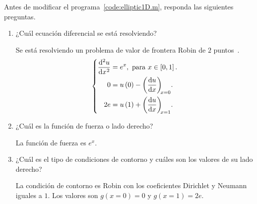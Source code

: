 \begin{problem}

Antes de modificar el programa~\ref{code:elliptic1D.m}, responda las
siguientes preguntas.

\begin{enumerate}
    \item

          ¿Cuál ecuación diferencial se está resolviendo?

          \begin{solution}
              Se está resolviendo un problema de valor de frontera
              Robin de $2$ puntos~\cite{CORBINO2020112326}.
              \begin{equation}\label{eq:poisson1drobindconditions}
                  \left\{
                  \begin{aligned}
                      \diff[2]{u}{x}
                       & =e^{x},
                      \text{ para }x\in\left[0,1\right].     \\
                      0
                       & = u\left(0\right)-\diff{u}{x}[x=0]. \\
                      2e
                       & =u\left(1\right)+\diff{u}{x}[x=1].
                  \end{aligned}
                  \right.
              \end{equation}
              \noQED
          \end{solution}

    \item

          ¿Cuál es la función de fuerza o lado derecho?

          \begin{solution}
              La función de fuerza es $e^{x}$.
              \noQED
          \end{solution}

    \item

          ¿Cuál es el tipo de condiciones de contorno y cuáles son
          los valores de su lado derecho?

          \begin{solution}
              La condición de contorno es Robin con los coeficientes
              Dirichlet y Neumann iguales a $1$.
              Los valores son $g\left(x=0\right)=0$ y
              $g\left(x=1\right)=2e$.
              \noQED
          \end{solution}


\end{enumerate}
\end{problem}
